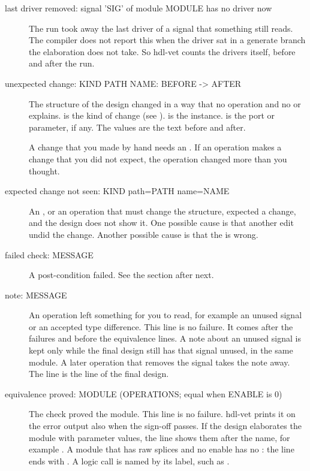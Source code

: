 \begin{description}
\item[last driver removed: signal 'SIG' of module MODULE has no driver now] The run took
  away the last driver of a signal that something still reads. The compiler does not report
  this when the driver sat in a generate branch the elaboration does not take. So hdl-vet
  counts the drivers itself, before and after the run.

\item[unexpected change: KIND PATH NAME: BEFORE -> AFTER] The structure of the
  design changed in a way that no operation and no  or 
  explains.  is the kind of change (see ). 
  is the instance.  is the port or parameter, if any. The values are the text
  before and after.

  A change that you made by hand needs an . If an operation
  makes a change that you did not expect, the operation changed more than you thought.

\item[expected change not seen: KIND path=PATH name=NAME] An , or an
  operation that must change the structure, expected a change, and the design does not
  show it. One possible cause is that another edit undid the change. Another possible
  cause is that the  is wrong.

\item[failed check: MESSAGE] A post-condition failed. See the section after next.

\item[note: MESSAGE] An operation left something for you to read, for example an unused
  signal or an accepted type difference. This line is no failure. It comes after the
  failures and before the equivalence lines. A note about an unused signal
  is kept only while the final design still has that signal unused, in the same module.
  A later operation that removes the signal takes the note away. The line is the line of
  the final design.

\item[equivalence proved: MODULE (OPERATIONS; equal when ENABLE is 0)] The check proved
  the module. This line is no failure. hdl-vet prints it on the error output also when
  the sign-off passes. If the design elaborates the module with parameter values, the
  line shows them after the name, for example . A module that
  has raw splices and no enable has no : the line ends with
  . A logic call is named by its label, such as
  .


\end{description}
